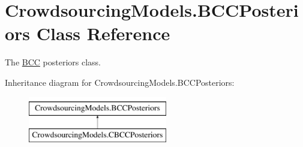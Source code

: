 \hypertarget{class_crowdsourcing_models_1_1_b_c_c_posteriors}{}\section{Crowdsourcing\+Models.\+B\+C\+C\+Posteriors Class Reference}
\label{class_crowdsourcing_models_1_1_b_c_c_posteriors}


The \hyperlink{class_crowdsourcing_models_1_1_b_c_c}{B\+C\+C} posteriors class.  


Inheritance diagram for Crowdsourcing\+Models.\+B\+C\+C\+Posteriors\+:\begin{figure}[H]
\begin{center}
\leavevmode
\includegraphics[height=2.000000cm]{class_crowdsourcing_models_1_1_b_c_c_posteriors}
\end{center}
\end{figure}
